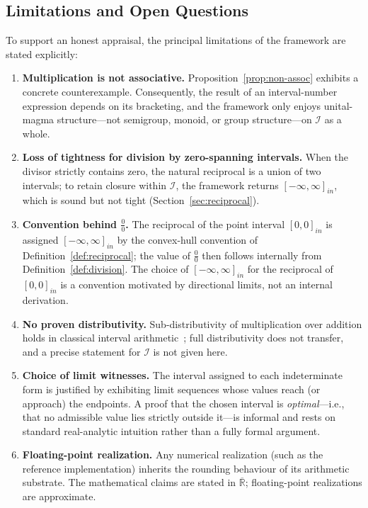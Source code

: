 \documentclass[11pt,a4paper]{article}
\theoremstyle{paperdef}
\newcommand{\Rext}{\overline{\mathbb{R}}}
\newcommand{\Iset}{\mathcal{I}}
\newcommand{\inI}[1]{[#1]_{in}}
\begin{document}
\subsection{Limitations and Open Questions}

To support an honest appraisal, the principal limitations of the
framework are stated explicitly:
\begin{enumerate}[leftmargin=2em]
  \item \textbf{Multiplication is not associative.}
    Proposition~\ref{prop:non-assoc} exhibits a concrete
    counterexample. Consequently, the result of an interval-number
    expression depends on its bracketing, and the framework only
    enjoys unital-magma structure---not semigroup, monoid, or group
    structure---on $\Iset$ as a whole.

  \item \textbf{Loss of tightness for division by zero-spanning
    intervals.} When the divisor strictly contains zero, the natural
    reciprocal is a union of two intervals; to retain closure within
    $\Iset$, the framework returns $\inI{-\infty, \infty}$, which is
    sound but not tight (Section~\ref{sec:reciprocal}).

  \item \textbf{Convention behind $\tfrac{0}{0}$.}
    The reciprocal of the point interval $\inI{0,0}$ is assigned
    $\inI{-\infty, \infty}$ by the convex-hull convention of
    Definition~\ref{def:reciprocal}; the value of $\tfrac{0}{0}$ then
    follows internally from Definition~\ref{def:division}. The choice
    of $\inI{-\infty, \infty}$ for the reciprocal of $\inI{0,0}$ is a
    convention motivated by directional limits, not an internal
    derivation.

  \item \textbf{No proven distributivity.} Sub-distributivity of
    multiplication over addition holds in classical interval
    arithmetic~\cite{Moore1966}; full distributivity does not
    transfer, and a precise statement for $\Iset$ is not given here.

  \item \textbf{Choice of limit witnesses.} The interval assigned to
    each indeterminate form is justified by exhibiting limit
    sequences whose values reach (or approach) the endpoints. A proof
    that the chosen interval is \emph{optimal}---i.e., that no
    admissible value lies strictly outside it---is informal and rests
    on standard real-analytic intuition rather than a fully formal
    argument.

  \item \textbf{Floating-point realization.} Any numerical
    realization (such as the reference implementation) inherits the
    rounding behaviour of its arithmetic substrate. The mathematical
    claims are stated in $\Rext$; floating-point realizations are
    approximate.
\end{enumerate}
\end{document}
